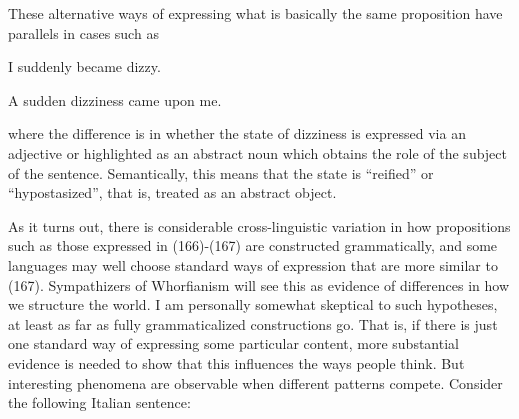 These alternative ways of expressing what is basically the same proposition have parallels in cases such as


\item 

\label{bkm:Ref107116648}I suddenly became dizzy.


\item 

\label{bkm:Ref107116651}A sudden dizziness came upon me.



where the difference is in whether the state of dizziness is expressed via an adjective or highlighted as an abstract noun which obtains the role of the subject of the sentence. Semantically, this means that the state is “reified” or “hypostasized”, that is, treated as an abstract object. 


As it turns out, there is considerable cross-linguistic variation in how propositions such as those expressed in (166){}-(167) are constructed grammatically, and some languages may well choose standard ways of expression that are more similar to (167). Sympathizers of Whorfianism will see this as evidence of differences in how we structure the world. I am personally somewhat skeptical to such hypotheses, at least as far as fully grammaticalized constructions go. That is, if there is just one standard way of expressing some particular content, more substantial evidence is needed to show that this influences the ways people think. But interesting phenomena are observable when different patterns compete. Consider the following Italian sentence:


